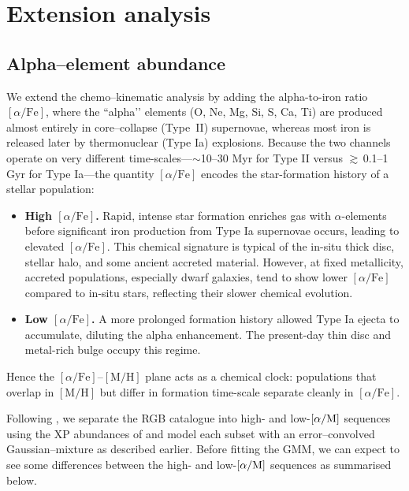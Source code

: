 \documentclass[a4paper,12pt]{article}
\begin{document}
\section{Extension analysis}
\subsection{Alpha–element abundance}
\label{subsec:alpha}

We extend the chemo–kinematic analysis by adding the
alpha-to-iron ratio $[\alpha/\mathrm{Fe}]$, where the “alpha’’ elements
(O, Ne, Mg, Si, S, Ca, Ti) are produced almost entirely in core–collapse
(\hbox{Type II}) supernovae, whereas most iron is released later by
thermonuclear (Type Ia) explosions.  Because the two channels operate on
very different time-scales—$\sim$10–30 Myr for Type II versus
$\gtrsim$\,0.1–1 Gyr for Type Ia—the quantity $[\alpha/\mathrm{Fe}]$
encodes the star-formation history of a stellar population:

\begin{itemize}
  \item \textbf{High $[\alpha/\mathrm{Fe}]$.}  
      Rapid, intense star formation enriches gas with $\alpha$-elements 
      before significant iron production from Type Ia supernovae occurs, 
      leading to elevated $[\alpha/\mathrm{Fe}]$. This chemical signature is typical 
      of the in-situ thick disc, stellar halo, and some ancient accreted material. 
      However, at fixed metallicity, accreted populations, especially dwarf galaxies,
       tend to show lower $[\alpha/\mathrm{Fe}]$ 
      compared to in-situ stars, reflecting their slower chemical evolution.


  \item \textbf{Low $[\alpha/\mathrm{Fe}]$.}  
        A more prolonged formation history allowed Type Ia ejecta to
        accumulate, diluting the alpha enhancement.  The present-day thin
        disc and metal-rich bulge occupy this regime.
\end{itemize}

Hence the $[\alpha/\mathrm{Fe}]$–$[\mathrm{M/H}]$ plane acts as a chemical
clock: populations that overlap in $[\mathrm{M/H}]$ but differ in formation
time-scale separate cleanly in $[\alpha/\mathrm{Fe}]$.

Following \citet{Vis2024}, we separate the RGB catalogue into
high- and low-$[\alpha/{\rm M}]$ sequences using the XP abundances of
\citet{Li2024} and model each subset with an error–convolved
Gaussian–mixture as described earlier.  Before fitting the GMM,
we can expect to see some differences between the high- and low-$[\alpha/{\rm M}]$ sequences
as summarised below.  
\end{document}
